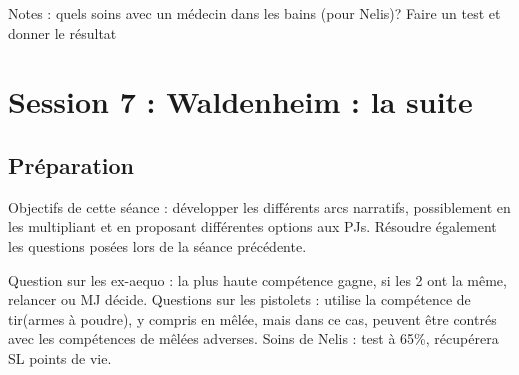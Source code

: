 \documentclass[10pt,a4paper]{book}
\begin{document}
Notes : quels soins avec un médecin dans les bains (pour Nelis)? Faire un test et donner le résultat

\section{Session 7 : Waldenheim : la suite}
\subsection{Préparation}
Objectifs de cette séance : développer les différents arcs narratifs, possiblement en les multipliant et en proposant différentes options aux PJs.
Résoudre également les questions posées lors de la séance précédente.

Question sur les ex-aequo : la plus haute compétence gagne, si les 2 ont la même, relancer ou MJ décide. Questions sur les pistolets : utilise la compétence de tir(armes à poudre), y compris en mêlée,  mais dans ce cas, peuvent être contrés avec les compétences de mêlées adverses. Soins de Nelis : test à 65\%, récupérera SL points de vie.
\end{document}
